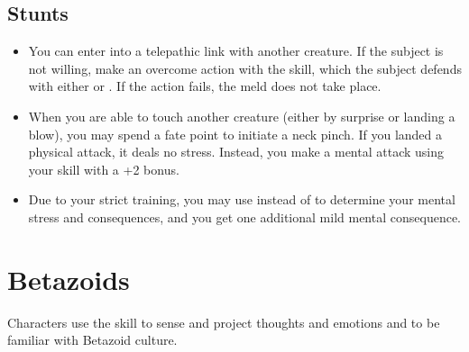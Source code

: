 \documentclass[12pt,titlepage,openany]{book}
\begin{document}
\subsection*{ Stunts}\label{subsec:vulcan-powers}
\begin{itemize}
    \item {} You can enter into a telepathic link with another
        creature. If the subject is not willing, make an overcome action with
        the  skill, which the subject defends with either
         or . If the action fails, the meld does not
        take place.

    \item {} When you are able to touch another creature
        (either by surprise or landing a blow), you may spend a fate point to
        initiate a neck pinch. If you landed a physical attack, it deals no
        stress. Instead, you make a mental attack using your 
        skill with a +2 bonus.

    \item {} Due to your strict training, you may use
         instead of  to determine your mental stress
        and consequences, and you get one additional mild mental consequence.
\end{itemize}

\section{Betazoids}\label{sec:betazoids}
Characters use the  skill to sense and project thoughts and
emotions and to be familiar with Betazoid culture.
\end{document}
